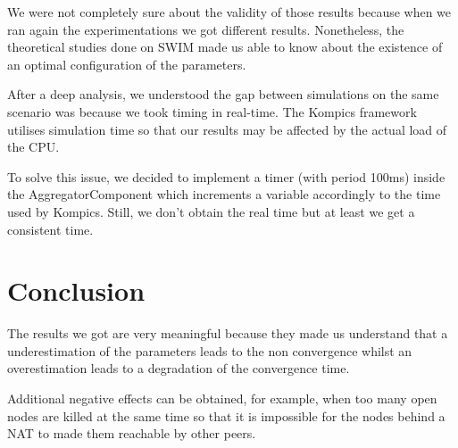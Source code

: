 \documentclass[10pt,a4paper]{article}
\begin{document}
We were not completely sure about the validity of those results because when we ran again the experimentations we got different results. Nonetheless, the theoretical studies done on SWIM made us able to know about the existence of an optimal configuration of the parameters. 

After a deep analysis, we understood the gap between simulations on the same scenario was because we took timing in real-time. The Kompics framework utilises simulation time so that our results may be affected by the actual load of the CPU.

To solve this issue, we decided to implement a timer (with period 100ms) inside the AggregatorComponent which increments a variable accordingly to the time used by Kompics. Still, we don't obtain the real time but at least we get a consistent time.

\section{Conclusion}

The results we got are very meaningful because they made us understand that a underestimation of the parameters leads to the non convergence whilst an overestimation leads to a degradation of the convergence time.

Additional negative effects can be obtained, for example, when too many open nodes are killed at the same time so that it is impossible for the nodes behind a NAT to made them reachable by other peers.
\end{document}
